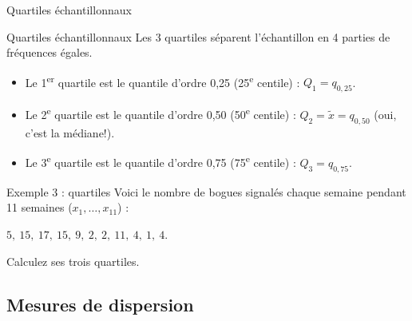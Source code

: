 \documentclass{BeamerTemplate}
\newcommand{\cibleReponse}{}
\newcommand{\lienreponse}[1]{\gdef\cibleReponse{#1}}
\begin{document}
\begin{frame}[t]{Quartiles échantillonnaux}

{\small
\begin{Boite}{Quartiles échantillonnaux}
Les \alert{3 quartiles} séparent l'échantillon en 4 parties de fréquences égales.
\begin{itemize}
\item Le 1\textsuperscript{er} quartile est le quantile d'ordre 0,25 (25\textsuperscript{e} centile) : \alert{$Q_1=q_{0,25}$}.
\item Le 2\textsuperscript{e} quartile est le quantile d'ordre 0,50 (50\textsuperscript{e} centile) :
\alert{$Q_2=\widetilde{x}=q_{0,50}$} (oui, c'est la médiane!).
\item Le 3\textsuperscript{e} quartile est le quantile d'ordre 0,75 (75\textsuperscript{e} centile) : \alert{$Q_3=q_{0,75}$}.
\end{itemize}
\end{Boite}
}
\end{frame}


\begin{frame}[t,label=exquartiles]{Exemple 3 : quartiles}
Voici le nombre de bogues signalés chaque semaine pendant 11 semaines ($x_1,\ldots,x_{11}$) :

{\small $5,~ 15,~ 17,~ 15,~  9,~  2,~  2,~ 11,~  4,~  1,~ 4.$}

\medskip
\begin{center}
\end{center}

Calculez ses trois quartiles.
\lienreponse{rep-ex}
\end{frame}

\subsection{Mesures de dispersion}
\end{document}
